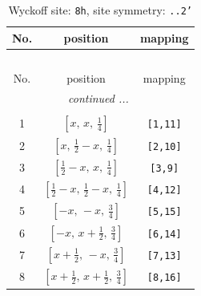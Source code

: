 \documentclass[fleqn,8pt]{jsarticle}
\begin{document}
\begin{longtable}{ccc}
\caption{Wyckoff site: {\tt 8h}, site symmetry: {\tt ..2'}}
 \\
 \hline \hline
No. & position & mapping \\ \hline \endfirsthead

\multicolumn{2}{l}{\tablename\ \thetable{}} \\
 \hline \hline
No. & position & mapping \\ \hline \endhead

 \hline \hline
\multicolumn{2}{r}{\footnotesize\it continued ...} \\ \endfoot

 \hline \hline
\multicolumn{2}{r}{} \\ \endlastfoot

1 & $\left[ x,\, x,\, \frac{1}{4} \right]$ & {\tt [1,11]} \\ \hline
2 & $\left[ x,\, \frac{1}{2} - x,\, \frac{1}{4} \right]$ & {\tt [2,10]} \\ \hline
3 & $\left[ \frac{1}{2} - x,\, x,\, \frac{1}{4} \right]$ & {\tt [3,9]} \\ \hline
4 & $\left[ \frac{1}{2} - x,\, \frac{1}{2} - x,\, \frac{1}{4} \right]$ & {\tt [4,12]} \\ \hline
5 & $\left[ - x,\, - x,\, \frac{3}{4} \right]$ & {\tt [5,15]} \\ \hline
6 & $\left[ - x,\, x + \frac{1}{2},\, \frac{3}{4} \right]$ & {\tt [6,14]} \\ \hline
7 & $\left[ x + \frac{1}{2},\, - x,\, \frac{3}{4} \right]$ & {\tt [7,13]} \\ \hline
8 & $\left[ x + \frac{1}{2},\, x + \frac{1}{2},\, \frac{3}{4} \right]$ & {\tt [8,16]} \\
\end{longtable}
\renewcommand{\arraystretch}{1.2}
\end{document}
